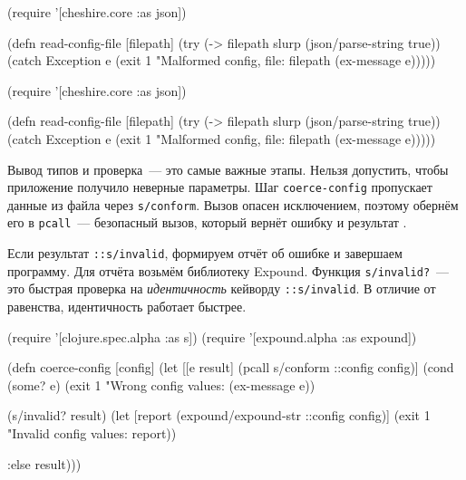 \ifx\devicetype\mobile

\begin{english}
  \begin{clojure}
(require '[cheshire.core :as json])

(defn read-config-file
  [filepath]
  (try
    (-> filepath
        slurp
        (json/parse-string true))
    (catch Exception e
      (exit 1
        "Malformed config,
                   file: %
            filepath (ex-message e)))))
  \end{clojure}
\end{english}

\else

\begin{english}
  \begin{clojure}
(require '[cheshire.core :as json])

(defn read-config-file
  [filepath]
  (try
    (-> filepath slurp (json/parse-string true))
    (catch Exception e
      (exit 1 "Malformed config, file: %
            filepath (ex-message e)))))
  \end{clojure}
\end{english}

\fi


Вывод типов и проверка~--- это самые важные этапы. Нельзя допустить, чтобы приложение
получило неверные параметры. Шаг \verb|coerce-config| пропускает данные из файла
через \verb|s/conform|. Вызов опасен исключением, поэтому обернём его в
\verb|pcall|~--- безопасный вызов, который вернёт ошибку и
результат .

Если результат \verb|::s/invalid|, формируем отчёт об ошибке и завершаем
программу. Для отчёта возьмём библиотеку Expound. Функция \verb|s/invalid?|~--- это
быстрая проверка на \emph{идентичность} кейворду \verb|::s/invalid|. В отличие
от равенства, идентичность работает быстрее.

\ifx\devicetype\mobile

\begin{english}
  \begin{clojure}
(require '[clojure.spec.alpha :as s])
(require '[expound.alpha :as expound])

(defn coerce-config [config]
  (let [[e result] (pcall s/conform
                     ::config config)]
    (cond
      (some? e)
      (exit 1 "Wrong config values: %
        (ex-message e))

      (s/invalid? result)
      (let [report (expound/expound-str
                     ::config config)]
        (exit 1
          "Invalid config values: %
          \newline report))

      :else result)))
  \end{clojure}
\end{english}

